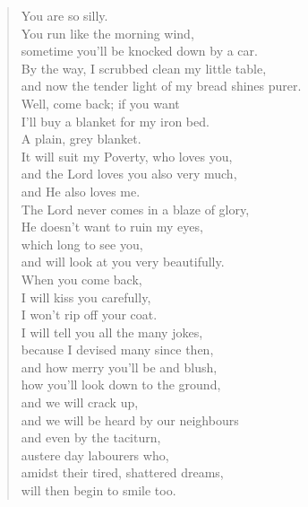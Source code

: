 \documentclass[11pt]{extbook}
\newcommand*{\centeredornament}{\centerline{\pgfornament[width=6cm]{88}}}
\begin{document}
\begin{verse}
  You are so silly. \\
  You run like the morning wind, \\
  sometime you'll be knocked down by a car. \\
  By the way, I scrubbed clean my little table, \\
  and now the tender light of my bread shines purer. \\
  Well, come back; if you want \\
  I'll buy a blanket for my iron bed. \\
  A plain, grey blanket. \\
  It will suit my Poverty, who loves you, \\
  and the Lord loves you also very much, \\
  and He also loves me. \\
  The Lord never comes in a blaze of glory, \\
  He doesn't want to ruin my eyes, \\
  which long to see you, \\
  and will look at you very beautifully. \\
  When you come back, \\
  I will kiss you carefully, \\
  I won't rip off your coat. \\
  I will tell you all the many jokes, \\
  because I devised many since then, \\
  and how merry you'll be and blush, \\
  how you'll look down to the ground, \\
  and we will crack up, \\
  and we will be heard by our neighbours \\
  and even by the taciturn, \\
  austere day labourers who, \\
  amidst their tired, shattered dreams, \\
  will then begin to smile too.
\end{verse}

\newpage

\vspace*{-15mm}
\centeredornament


\end{document}

